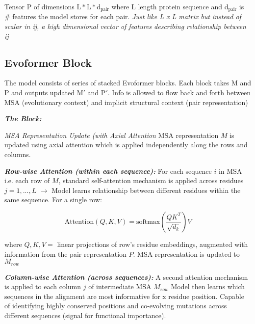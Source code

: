 \documentclass[../main.tex]{subfiles}
\begin{document}
Tensor $\mathrm{P}$ of dimensions $\mathrm{L} * \mathrm{L} * \mathrm{d_{pair}}$ where $\mathrm{L}$ length protein sequence and $\mathrm{d_{pair}}$ is $\#$ features the model stores for each pair. \textit{Just like L x L matrix but instead of scalar in ij, a high dimensional vector of features describing relationship between ij}

\hrulefill

\subsection*{Evoformer Block}
The model consists of series of stacked Evoformer blocks. Each block takes $\mathrm{M}$ and $\mathrm{P}$ and outputs updated $\mathrm{M'}$ and $\mathrm{P'}$. Info is allowed to flow back and forth between MSA (evolutionary context) and implicit structural context (pair representation)

\vspace{0.3cm}

\textbf{\textit{\large{The Block:}}}

\vspace{0.3cm}

\textit{\large{MSA Representation Update (with Axial Attention}}
MSA representation $M$ is updated using axial attention which is applied independently along the rows and columns.

\vspace{0.3cm}

\textit{\textbf{Row-wise Attention (within each sequence):}} For each sequence $i$ in MSA i.e. each row of $M$, standard self-attention mechanism is applied across residues $j=1,...,L$ $\rightarrow$ Model learns relationship between different residues within the same sequence. For a single row: 

\begin{equation}
    \text{Attention}(Q, K, V) = \text{softmax}\left(\frac{Q K^T}{\sqrt{d_k}}\right) V
\end{equation}

where $Q,K,V =$ linear projections of row's residue embeddings, augmented with information from the pair representation $P$. MSA representation is updated to $M_{row}$ 

\vspace{0.3cm}

\textit{\textbf{Column-wise Attention (across sequences):}} A second attention mechanism is applied to each column $j$ of intermediate MSA $M_{row}$ Model then learns which sequences in the alignment are most informative for x residue position. Capable of identifying highly conserved positions and co-evolving mutations across different sequences (signal for functional importance).
\end{document}
